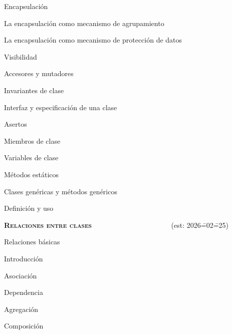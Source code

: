 \begin{longenum}
\begin{longenum}
\begin{longenum}
        \end{longenum}
        \item Encapsulación
        \begin{longenum}
            \item La encapsulación como mecanismo de agrupamiento
            \item La encapsulación como mecanismo de protección de datos
            \begin{longenum}
                \item Visibilidad
                \item Accesores y mutadores
                \item Invariantes de clase
                \item Interfaz y especificación de una clase
                \item Asertos
            \end{longenum}
        \end{longenum}
        \item Miembros de clase
        \begin{longenum}
            \item Variables de clase
            \item Métodos estáticos
        \end{longenum}
        \item Clases genéricas y métodos genéricos
        \begin{longenum}
            \item Definición y uso
        \end{longenum}
    \end{longenum}
    \item \textbf{\textsc{Relaciones entre clases}} \ \ \ \ \ \ \ \ \ \ \ \ \ \ \ \ \ \ \ \ \ \ (est: 2026\==02\==25)
    \begin{longenum}
        \item Relaciones básicas
        \begin{longenum}
            \item Introducción
            \item Asociación
            \item Dependencia
            \item Agregación
            \item Composición
        \end{longenum}

\end{longenum}
\end{longenum}
